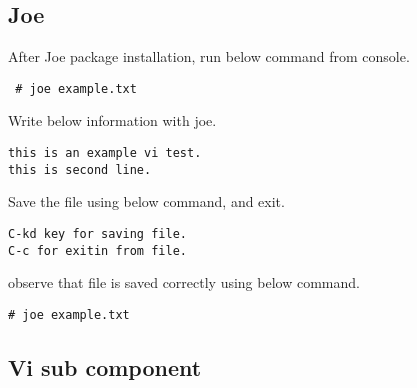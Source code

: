 \documentclass[a4paper,10pt]{article}
\begin{document}
\subsection*{Joe}

After Joe package installation, run below command from console.

\begin{verbatim}
 # joe example.txt
\end{verbatim}

Write below information with joe.
\begin{verbatim}
this is an example vi test.
this is second line.
\end{verbatim}

Save the file using below command, and exit.
\begin{verbatim}
C-kd key for saving file.
C-c for exitin from file.
\end{verbatim}


observe that file is saved correctly using below command.
\begin{verbatim}
# joe example.txt 
\end{verbatim}

\subsection*{Vi sub component}
\end{document}
